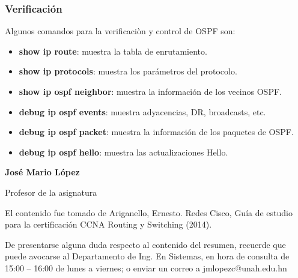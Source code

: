 \documentclass[12pt]{article}
\begin{document}
\subsubsection{Verificación}
Algunos comandos para la verificaciòn y control de OSPF son:
\begin{itemize}
\item \textbf{show ip route}: muestra la tabla de enrutamiento.
\item \textbf{show ip protocols}: muestra los parámetros del protocolo.
\item \textbf{show ip ospf neighbor}: muestra la información de los vecinos OSPF.
\item \textbf{debug ip ospf events}: muestra adyacencias, DR, broadcasts, etc.
\item \textbf{debug ip ospf packet}: muestra la información de los paquetes de OSPF.
\item \textbf{debug ip ospf hello}: muestra las actualizaciones Hello.
\end{itemize}

\vfill
{\textbf {\normalsize José Mario López}}

{\small Profesor de la asignatura\\}

{\footnotesize 
El contenido fue tomado de Ariganello, Ernesto. Redes Cisco, Guía de estudio para la certificación CCNA Routing y Switching (2014).

De presentarse alguna duda respecto al contenido del resumen, recuerde que puede avocarse al Departamento de Ing. En Sistemas, en hora de consulta de 15:00 – 16:00 de lunes a viernes; o enviar un correo a jmlopezc@unah.edu.hn}
\end{document}
